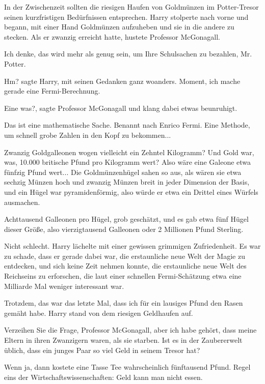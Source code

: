 In der Zwischenzeit sollten die riesigen Haufen von Goldmünzen im Potter-Tresor
seinen kurzfristigen Bedürfnissen entsprechen. Harry stolperte nach vorne und
begann, mit einer Hand Goldmünzen aufzuheben und sie in die andere zu stecken.
Als er zwanzig erreicht hatte, hustete Professor McGonagall.

\glqq Ich denke, das wird mehr als genug sein, um Ihre Schulsachen zu bezahlen,
Mr. Potter.\grqq{}

\glqq Hm?\grqq{} sagte Harry, mit seinen Gedanken ganz woanders. \glqq Moment,
ich mache gerade eine Fermi-Berechnung.\grqq{}

\glqq Eine was?\grqq{}, sagte Professor McGonagall und klang dabei etwas
beunruhigt.

\glqq Das ist eine mathematische Sache. Benannt nach Enrico Fermi. Eine Methode,
um schnell grobe Zahlen in den Kopf zu bekommen...\grqq{}

Zwanzig Goldgalleonen wogen vielleicht ein Zehntel Kilogramm? Und Gold war, was,
10.000 britische Pfund pro Kilogramm wert? Also wäre eine Galeone etwa fünfzig
Pfund wert... Die Goldmünzenhügel sahen so aus, als wären sie etwa sechzig
Münzen hoch und zwanzig Münzen breit in jeder Dimension der Basis, und ein Hügel
war pyramidenförmig, also würde er etwa ein Drittel eines Würfels ausmachen.

Achttausend Galleonen pro Hügel, grob geschätzt, und es gab etwa fünf Hügel
dieser Größe, also vierzigtausend Galleonen oder 2 Millionen Pfund Sterling.

Nicht schlecht. Harry lächelte mit einer gewissen grimmigen Zufriedenheit. Es
war zu schade, dass er gerade dabei war, die erstaunliche neue Welt der Magie zu
entdecken, und sich keine Zeit nehmen konnte, die erstaunliche neue Welt des
Reichseins zu erforschen, die laut einer schnellen Fermi-Schätzung etwa eine
Milliarde Mal weniger interessant war.

Trotzdem, das war das letzte Mal, dass ich für ein lausiges Pfund den Rasen
gemäht habe. Harry stand von dem riesigen Geldhaufen auf.

\glqq Verzeihen Sie die Frage, Professor McGonagall, aber ich habe gehört, dass
meine Eltern in ihren Zwanzigern waren, als sie starben. Ist es in der
Zaubererwelt üblich, dass ein junges Paar so viel Geld in seinem Tresor
hat?\grqq{}

Wenn ja, dann kostete eine Tasse Tee wahrscheinlich fünftausend Pfund. Regel
eins der Wirtschaftswissenschaften: Geld kann man nicht essen.

